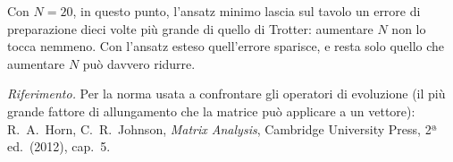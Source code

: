 \documentclass[11pt,a4paper]{article}
\begin{document}
\FloatBarrier

Con $N=20$, in questo punto, l'ansatz minimo lascia sul tavolo un errore di
preparazione dieci volte più grande di quello di Trotter: aumentare $N$ non
lo tocca nemmeno. Con l'ansatz esteso quell'errore sparisce, e resta solo
quello che aumentare $N$ può davvero ridurre.


\bigskip
\noindent\footnotesize\textit{Riferimento.} Per la norma usata a confrontare
gli operatori di evoluzione (il più grande fattore di allungamento che la
matrice può applicare a un vettore): R.~A.~Horn, C.~R.~Johnson, \emph{Matrix
Analysis}, Cambridge University Press, 2ª ed.\ (2012), cap.~5.
\end{document}
